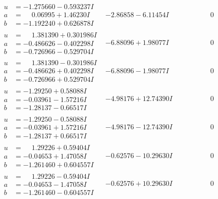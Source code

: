 \documentclass[1p]{elsarticle_modified}
\theoremstyle{definition}
\begin{document}
$$\begin{array}{c|c|c}
\begin{aligned}
u &= -1.275660 - 0.593237 I \\
a &= \phantom{-}0.06995 + 1.46230 I \\
b &= -1.192240 + 0.626878 I\end{aligned}
 & -2.86858 - 6.11454 I & \phantom{-0.000000 } 0 \\ \hline\begin{aligned}
u &= \phantom{-}1.381390 + 0.301986 I \\
a &= -0.486626 - 0.402298 I \\
b &= -0.726966 - 0.529704 I\end{aligned}
 & -6.88096 + 1.98077 I & \phantom{-0.000000 } 0 \\ \hline\begin{aligned}
u &= \phantom{-}1.381390 - 0.301986 I \\
a &= -0.486626 + 0.402298 I \\
b &= -0.726966 + 0.529704 I\end{aligned}
 & -6.88096 - 1.98077 I & \phantom{-0.000000 } 0 \\ \hline\begin{aligned}
u &= -1.29250 + 0.58088 I \\
a &= -0.03961 - 1.57216 I \\
b &= -1.28137 - 0.66517 I\end{aligned}
 & -4.98176 + 12.74390 I & \phantom{-0.000000 } 0 \\ \hline\begin{aligned}
u &= -1.29250 - 0.58088 I \\
a &= -0.03961 + 1.57216 I \\
b &= -1.28137 + 0.66517 I\end{aligned}
 & -4.98176 - 12.74390 I & \phantom{-0.000000 } 0 \\ \hline\begin{aligned}
u &= \phantom{-}1.29226 + 0.59404 I \\
a &= -0.04653 + 1.47058 I \\
b &= -1.261460 + 0.604557 I\end{aligned}
 & -0.62576 - 10.29630 I & \phantom{-0.000000 } 0 \\ \hline\begin{aligned}
u &= \phantom{-}1.29226 - 0.59404 I \\
a &= -0.04653 - 1.47058 I \\
b &= -1.261460 - 0.604557 I\end{aligned}
 & -0.62576 + 10.29630 I & \phantom{-0.000000 } 0 \\ \hline\begin{aligned}

\end{aligned}
\end{array}$$
\end{document}
